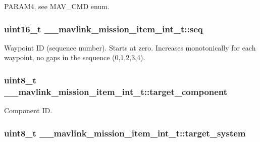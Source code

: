 P\+A\+R\+A\+M4, see M\+A\+V\+\_\+\+C\+M\+D enum. 

\hypertarget{struct____mavlink__mission__item__int__t_a39fff7ff91575a05c79c2228b4f2531a}{
\subsubsection[{seq}]{\setlength{\rightskip}{0pt plus 5cm}uint16\+\_\+t \+\_\+\+\_\+mavlink\+\_\+mission\+\_\+item\+\_\+int\+\_\+t\+::seq}}\label{struct____mavlink__mission__item__int__t_a39fff7ff91575a05c79c2228b4f2531a}


Waypoint I\+D (sequence number). Starts at zero. Increases monotonically for each waypoint, no gaps in the sequence (0,1,2,3,4). 

\hypertarget{struct____mavlink__mission__item__int__t_a5dea69c24977117f7329db125f7b3c44}{
\subsubsection[{target\+\_\+component}]{\setlength{\rightskip}{0pt plus 5cm}uint8\+\_\+t \+\_\+\+\_\+mavlink\+\_\+mission\+\_\+item\+\_\+int\+\_\+t\+::target\+\_\+component}}\label{struct____mavlink__mission__item__int__t_a5dea69c24977117f7329db125f7b3c44}


Component I\+D. 

\hypertarget{struct____mavlink__mission__item__int__t_aed52ddfacceede1c089bfff6a57aaa97}{
\subsubsection[{target\+\_\+system}]{\setlength{\rightskip}{0pt plus 5cm}uint8\+\_\+t \+\_\+\+\_\+mavlink\+\_\+mission\+\_\+item\+\_\+int\+\_\+t\+::target\+\_\+system}}\label{struct____mavlink__mission__item__int__t_aed52ddfacceede1c089bfff6a57aaa97}


